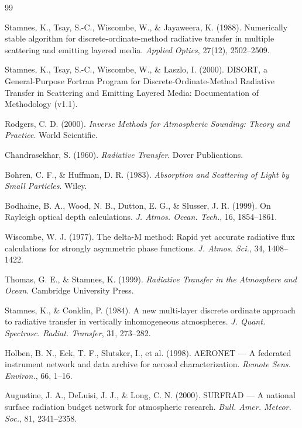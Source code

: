 \documentclass[a4paper,11pt]{article}
\begin{document}
\begin{thebibliography}{99}

Stamnes, K., Tsay, S.-C., Wiscombe, W., \& Jayaweera, K. (1988).
Numerically stable algorithm for discrete-ordinate-method radiative transfer
in multiple scattering and emitting layered media.
\emph{Applied Optics}, 27(12), 2502--2509.

Stamnes, K., Tsay, S.-C., Wiscombe, W., \& Laszlo, I. (2000).
DISORT, a General-Purpose Fortran Program for Discrete-Ordinate-Method
Radiative Transfer in Scattering and Emitting Layered Media:
Documentation of Methodology (v1.1).

Rodgers, C. D. (2000).
\emph{Inverse Methods for Atmospheric Sounding: Theory and Practice}.
World Scientific.

Chandrasekhar, S. (1960).
\emph{Radiative Transfer}.
Dover Publications.

Bohren, C. F., \& Huffman, D. R. (1983).
\emph{Absorption and Scattering of Light by Small Particles}.
Wiley.

Bodhaine, B. A., Wood, N. B., Dutton, E. G., \& Slusser, J. R. (1999).
On Rayleigh optical depth calculations.
\emph{J. Atmos. Ocean. Tech.}, 16, 1854--1861.

Wiscombe, W. J. (1977).
The delta-M method: Rapid yet accurate radiative flux calculations for
strongly asymmetric phase functions.
\emph{J. Atmos. Sci.}, 34, 1408--1422.

Thomas, G. E., \& Stamnes, K. (1999).
\emph{Radiative Transfer in the Atmosphere and Ocean}.
Cambridge University Press.

Stamnes, K., \& Conklin, P. (1984).
A new multi-layer discrete ordinate approach to radiative transfer in
vertically inhomogeneous atmospheres.
\emph{J. Quant. Spectrosc. Radiat. Transfer}, 31, 273--282.

Holben, B. N., Eck, T. F., Slutsker, I., et al. (1998).
AERONET --- A federated instrument network and data archive for
aerosol characterization.
\emph{Remote Sens. Environ.}, 66, 1--16.

Augustine, J. A., DeLuisi, J. J., \& Long, C. N. (2000).
SURFRAD --- A national surface radiation budget network for
atmospheric research.
\emph{Bull. Amer. Meteor. Soc.}, 81, 2341--2358.


\end{thebibliography}
\end{document}

